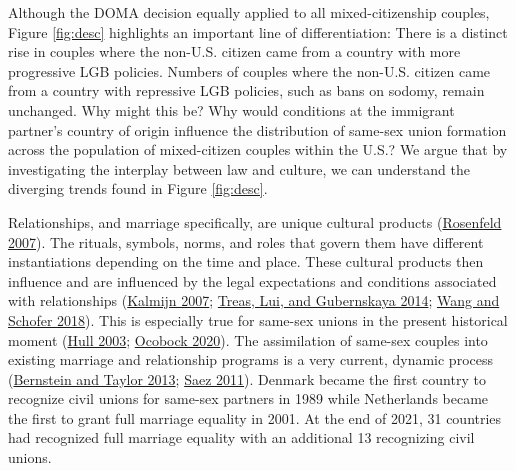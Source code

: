 \documentclass[
  12pt,
]{article}
\begin{document}
Although the DOMA decision equally applied to all mixed-citizenship couples, Figure \ref{fig:desc} highlights an important line of differentiation: There is a distinct rise in couples where the non-U.S. citizen came from a country with more progressive LGB policies. Numbers of couples where the non-U.S. citizen came from a country with repressive LGB policies, such as bans on sodomy, remain unchanged. Why might this be? Why would conditions at the immigrant partner's country of origin influence the distribution of same-sex union formation across the population of mixed-citizen couples within the U.S.? We argue that by investigating the interplay between law and culture, we can understand the diverging trends found in Figure \ref{fig:desc}.

Relationships, and marriage specifically, are unique cultural products (\protect\hyperlink{ref-rosenfeld_2007_age}{Rosenfeld 2007}). The rituals, symbols, norms, and roles that govern them have different instantiations depending on the time and place. These cultural products then influence and are influenced by the legal expectations and conditions associated with relationships (\protect\hyperlink{ref-kalmijn_2007_explaining}{Kalmijn 2007}; \protect\hyperlink{ref-treas_2014_attitudes}{Treas, Lui, and Gubernskaya 2014}; \protect\hyperlink{ref-wang_2018_coming}{Wang and Schofer 2018}). This is especially true for same-sex unions in the present historical moment (\protect\hyperlink{ref-hull_2003_cultural}{Hull 2003}; \protect\hyperlink{ref-ocobock_2020_leveraging}{Ocobock 2020}). The assimilation of same-sex couples into existing marriage and relationship programs is a very current, dynamic process
(\protect\hyperlink{ref-bernstein_2013_marrying}{Bernstein and Taylor 2013}; \protect\hyperlink{ref-saez_2011_samesex}{Saez 2011}). Denmark became the first country to recognize civil unions for same-sex partners in 1989 while Netherlands became the first to grant full marriage equality in 2001. At the end of 2021, 31 countries had recognized full marriage equality with an additional 13 recognizing civil unions.
\end{document}
